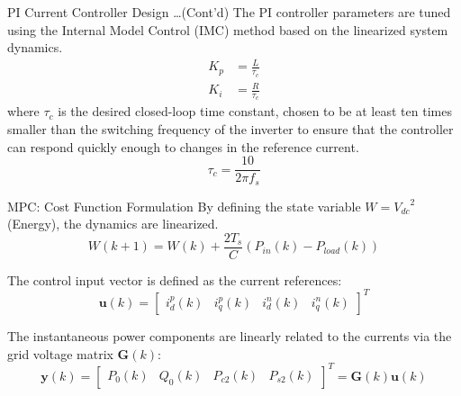 \documentclass[aspectratio=169]{beamer}
\begin{document}

\begin{frame}{PI Current Controller Design \dots(Cont'd)}
    The PI controller parameters are tuned using the Internal Model Control (IMC) method based on 
    the linearized system dynamics. 
    \begin{equation*}
        \begin{split}
            K_{p} &= \frac{L}{\tau_c} \\
            K_{i} &= \frac{R}{\tau_c}
        \end{split}
    \end{equation*}
    where $\tau_c$ is the desired closed-loop time constant, chosen to be at least ten times smaller than the
    switching frequency of the inverter to ensure that the controller can respond quickly enough to
    changes in the reference current.
    \begin{equation*}
        \tau_c = \frac{10}{2 \pi f_{s}}
    \end{equation*}
\end{frame}

\begin{frame}{MPC: Cost Function Formulation}
    By defining the state variable $W = {V_{dc}}^{2}$ (Energy), the dynamics are linearized. 
    \begin{equation*}
        W(k+1) = W(k) + \frac{2 T_s}{C} \left( P_{in}(k) - P_{load}(k) \right)
    \end{equation*}

    The control input vector is defined as the current references:
    \begin{equation*}
        \mathbf{u}(k) = \begin{bmatrix} i_d^p(k) & i_q^p(k) & i_d^n(k) & i_q^n(k) \end{bmatrix}^T
    \end{equation*}

    The instantaneous power components are linearly related to the currents via the grid voltage matrix $\mathbf{G}(k)$:
    \begin{equation*}
        \mathbf{y}(k) = \begin{bmatrix} P_0(k) & Q_0(k) & P_{c2}(k) & P_{s2}(k) \end{bmatrix}^T = \mathbf{G}(k) \mathbf{u}(k)
    \end{equation*}
\end{frame}
\end{document}
